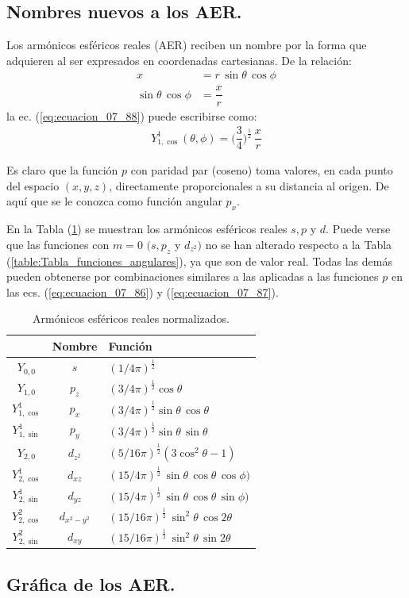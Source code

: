 \subsection{Nombres nuevos a los AER.}

Los armónicos esféricos reales (AER) reciben un nombre por la forma que adquieren al ser expresados en coordenadas cartesianas. De la relación:
\begin{align*}
x &= r \, \sin \theta \, \cos \phi \\[0.5em]
\sin \theta \, \cos \phi &= \dfrac{x}{r}
\end{align*}
la ec. (\ref{eq:ecuacion_07_88}) puede escribirse como:
\begin{align*}
Y_{1, \cos}^{1} (\theta, \phi) = \bigg( \dfrac{3}{4} \bigg)^{\frac{1}{2}} \, \dfrac{x}{r}
\end{align*}

Es claro que la función $p$ con paridad par (coseno) toma valores, en cada punto del espacio $(x, y, z)$, directamente proporcionales a su distancia al origen. De aquí que se le conozca como función angular $p_{x}$.
\par
En la Tabla (\ref{table:Tabla_AERN}) se muestran los armónicos esféricos reales $s, p$ y $d$. Puede verse que las funciones con $m = 0$ $(s, p_{z}$ y $d_{z^{2}})$ no se han alterado respecto a la Tabla (\ref{table:Tabla_funciones_angulares}), ya que son de valor real. Todas las demás pueden obtenerse por combinaciones similares a las aplicadas a las funciones $p$ en las ecs. (\ref{eq:ecuacion_07_86}) y (\ref{eq:ecuacion_07_87}).
\begin{table}
\centering
\large
\renewcommand{\arraystretch}{1.5}
\begin{tabular}{|c | c | l|} \hline
 & Nombre & Función \\ \hline
$Y_{0,0}$ & $s$ & $(1/4 \pi)^{\frac{1}{2}}$ \\ \hline
$Y_{1,0}$ & $p_{z}$ & $(3/4 \pi)^{\frac{1}{2}} \cos \theta$ \\ \hline
$Y_{1, \cos}^{1}$ & $p_{x}$ & $(3/4 \pi)^{\frac{1}{2}} \sin \theta \, \cos \theta$ \\ \hline
$Y_{1, \sin}^{1}$ & $p_{y}$ & $(3/4 \pi)^{\frac{1}{2}} \sin \theta \, \sin \theta$ \\ \hline
$Y_{2, 0}$ & $d_{z^{2}}$ & $(5/16 \pi)^{\frac{1}{2}} (3 \cos^{2} \theta  - 1)$ \\ \hline
$Y_{2, \cos}^{1}$ & $d_{xz}$ & $(15/4 \pi)^{\frac{1}{2}} \, \sin \theta \, \cos \theta \, \cos \phi)$ \\ \hline
$Y_{2, \sin}^{1}$ & $d_{yz}$ & $(15/4 \pi)^{\frac{1}{2}} \, \sin \theta \, \cos \theta \, \sin \phi)$ \\ \hline
$Y_{2, \cos}^{2}$ & $d_{x^{2}-y^{2}}$ & $(15/16 \pi)^{\frac{1}{2}} \, \sin^{2} \theta \, \cos 2 \theta$ \\ \hline
$Y_{2, \sin}^{2}$ & $d_{xy}$ & $(15/16 \pi)^{\frac{1}{2}} \, \sin^{2} \theta \, \sin 2 \theta$ \\ \hline
\end{tabular}
\caption{Armónicos esféricos reales normalizados.}
\label{table:Tabla_AERN}
\end{table}

\subsection{Gráfica de los AER.}

